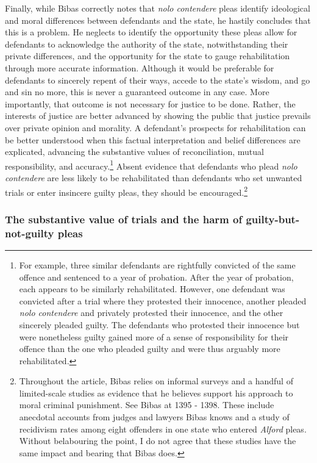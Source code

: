 Finally, while Bibas correctly notes that \textit{nolo contendere} pleas identify ideological and moral differences between defendants and the state, he hastily concludes that this is a problem. He neglects to identify the opportunity these pleas allow for defendants to acknowledge the authority of the state, notwithstanding their private differences, and the opportunity for the state to gauge rehabilitation through more accurate information. Although it would be preferable for defendants to sincerely repent of their ways, accede to the state's wisdom, and go and sin no more, this is never a guaranteed outcome in any case. More importantly, that outcome is not necessary for justice to be done. Rather, the interests of justice are better advanced by showing the public that justice prevails over private opinion and morality. A defendant's prospects for rehabilitation can be better understood when this factual interpretation and belief differences are explicated, advancing the substantive values of reconciliation, mutual responsibility, and accuracy.\footnote{For example, three similar defendants are rightfully convicted of the same offence and sentenced to a year of probation. After the year of probation, each appears to be similarly rehabilitated. However, one defendant was convicted after a trial where they protested their innocence, another pleaded \textit{nolo contendere} and privately protested their innocence, and the other sincerely pleaded guilty. The defendants who protested their innocence but were nonetheless guilty gained more of a sense of responsibility for their offence than the one who pleaded guilty and were thus arguably more rehabilitated.} Absent evidence that defendants who plead \textit{nolo contendere} are less likely to be rehabilitated than defendants who set unwanted trials or enter insincere guilty pleas, they should be encouraged.\footnote{Throughout the article, Bibas relies on informal surveys and a handful of limited-scale studies as evidence that he believes support his approach to moral criminal punishment. See Bibas at 1395 - 1398. These include anecdotal accounts from judges and lawyers Bibas knows and a study of recidivism rates among eight offenders in one state who entered \textit{Alford} pleas. Without belabouring the point, I do not agree that these studies have the same impact and bearing that Bibas does.} 

\subsubsection{The substantive value of trials and the harm of guilty-but-not-guilty pleas}

